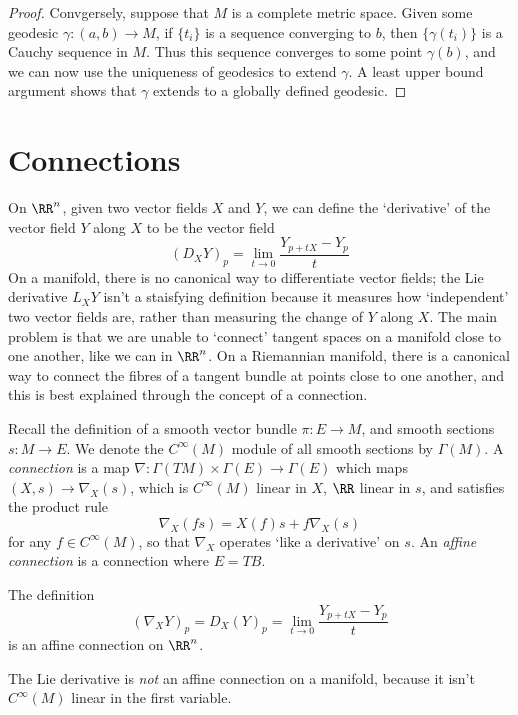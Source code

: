\begin{proof}
    Convgersely, suppose that $M$ is a complete metric space. Given some geodesic $\gamma: (a,b) \to M$, if $\{ t_i \}$ is a sequence converging to $b$, then $\{ \gamma(t_i) \}$ is a Cauchy sequence in $M$. Thus this sequence converges to some point $\gamma(b)$, and we can now use the uniqueness of geodesics to extend $\gamma$. A least upper bound argument shows that $\gamma$ extends to a globally defined geodesic.
\end{proof}

\section{Connections}

On $\RR^n$, given two vector fields $X$ and $Y$, we can define the `derivative' of the vector field $Y$ along $X$ to be the vector field
%
\[ (D_X Y)_p = \lim_{t \to 0} \frac{Y_{p + tX} - Y_p}{t} \]
%
On a manifold, there is no canonical way to differentiate vector fields; the Lie derivative $L_XY$ isn't a staisfying definition because it measures how `independent' two vector fields are, rather than measuring the change of $Y$ along $X$. The main problem is that we are unable to `connect' tangent spaces on a manifold close to one another, like we can in $\RR^n$. On a Riemannian manifold, there is a canonical way to connect the fibres of a tangent bundle at points close to one another, and this is best explained through the concept of a connection.

Recall the definition of a smooth vector bundle $\pi: E \to M$, and smooth sections $s: M \to E$. We denote the $C^\infty(M)$ module of all smooth sections by $\Gamma(M)$. A \emph{connection} is a map $\nabla: \Gamma(TM) \times \Gamma(E) \to \Gamma(E)$ which maps $(X,s) \to \nabla_X(s)$, which is $C^\infty(M)$ linear in $X$, $\RR$ linear in $s$, and satisfies the product rule
%
\[ \nabla_X(fs) = X(f)s + f\nabla_X(s) \]
%
for any $f \in C^\infty(M)$, so that $\nabla_X$ operates `like a derivative' on $s$. An \emph{affine connection} is a connection where $E = TB$.

\begin{example}
    The definition
    \[ (\nabla_X Y)_p = D_X(Y)_p = \lim_{t \to 0} \frac{Y_{p + tX} - Y_p}{t} \]
    is an affine connection on $\RR^n$.
\end{example}

\begin{example}
    The Lie derivative is {\it not} an affine connection on a manifold, because it isn't $C^\infty(M)$ linear in the first variable.
\end{example}

